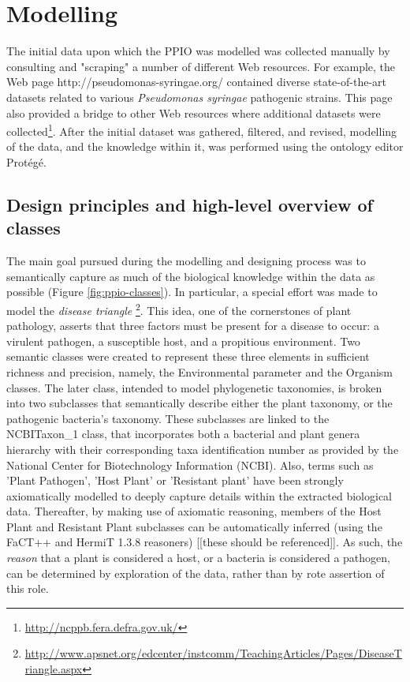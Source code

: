 \documentclass[sw]{iosart2c}
\newcommand{\myurl}[1]{\footnote{\url{#1}}}
\begin{document}



\section{Modelling}

The initial data upon which the PPIO was modelled was collected manually by consulting and "scraping" a number of different Web resources. For example, the Web page http://pseudomonas-syringae.org/ contained diverse state-of-the-art datasets related to various {\itshape Pseudomonas syringae} pathogenic strains. This page also provided a bridge to other Web resources where additional datasets were collected\myurl{http://ncppb.fera.defra.gov.uk/}. After the initial dataset was gathered, filtered, and revised, modelling of the data, and the knowledge within it, was performed using the ontology editor Prot\'eg\'e.

\subsection{Design principles and high-level overview of classes}

The main goal pursued during the modelling and designing process was to semantically capture as much of the biological knowledge within the data as possible (Figure \ref{fig:ppio-classes}). In particular, a special effort was made to model the {\itshape disease triangle} \myurl{http://www.apsnet.org/edcenter/instcomm/TeachingArticles/Pages/DiseaseTriangle.aspx}. This idea, one of the cornerstones of plant pathology, asserts that three factors must be present for a disease to occur: a virulent pathogen, a susceptible host, and a propitious environment. Two semantic classes were created to represent these three elements in sufficient richness and precision, namely, the {\sf Environmental parameter} and the {\sf Organism} classes. The later class, intended to model phylogenetic taxonomies, is broken into two subclasses that semantically describe either the plant taxonomy, or the pathogenic bacteria's taxonomy.  These subclasses are linked to the {\sf NCBITaxon\_1} class, that incorporates both a bacterial and plant genera hierarchy with their corresponding taxa identification number as provided by the National Center for Biotechnology Information (NCBI). Also, terms such as {\sf 'Plant Pathogen'}, {\sf 'Host Plant'} or {\sf 'Resistant plant'} have been strongly axiomatically modelled to deeply capture details within the extracted biological data.  Thereafter, by making use of axiomatic reasoning, members of the {\sf Host Plant} and {\sf Resistant Plant} subclasses can be automatically inferred (using the FaCT++ and HermiT 1.3.8 reasoners) [[these should be referenced]]. As such, the {\itshape reason} that a plant is considered a host, or a bacteria is considered a pathogen, can be determined by exploration of the data, rather than by rote assertion of this role.
\end{document}

